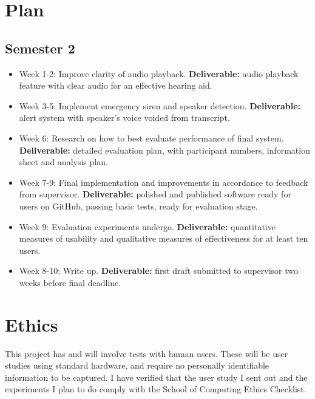 \documentclass[11pt]{article}
\begin{document}
\section{Plan}\label{plan}

\subsection{Semester 2}

\begin{itemize}
    \tightlist
    \item
      Week 1-2: Improve clarity of audio playback. \textbf{Deliverable:} audio playback feature with clear audio for an effective hearing aid.
    \item
      Week 3-5: Implement emergency siren and speaker detection. \textbf{Deliverable:} alert system with speaker's voice voided from transcript.
    \item
      Week 6: Research on how to best evaluate performance of final system. \textbf{Deliverable:} detailed evaluation plan, with participant numbers, information sheet and analysis plan.
    \item
      Week 7-9: Final implementation and improvements in accordance to feedback from supervisor. \textbf{Deliverable:} polished and published software ready for users on GitHub, passing basic tests, ready for evaluation stage.
    \item
      Week 9: Evaluation experiments undergo. \textbf{Deliverable:} quantitative measures of usability and qualitative measures of effectiveness for at least ten users.
    \item
      Week 8-10: Write up. \textbf{Deliverable:} first draft submitted to supervisor two weeks before final deadline.
    \end{itemize}

\section{Ethics}

This project has and will involve tests with human users.  These will be user studies using standard hardware, and require no personally identifiable information to be captured. I have verified that the user study I sent out and the experiments I plan to do comply with the School of Computing Ethics Checklist.

\def\UrlBreaks{\do\/\do-}


\end{document}
